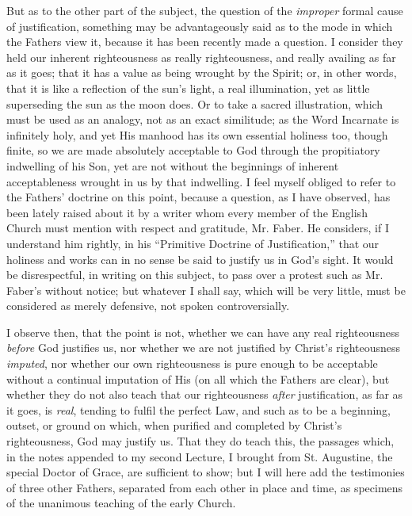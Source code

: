 But as to the other part of the subject, the question of the \emph{improper} formal cause of justification, something may be
advantageously said as to the mode in which the Fathers view it,
because it has been recently made a question. I consider they held our
inherent righteousness as really righteousness, and really availing as
far as it goes; that it has a value as being wrought by the Spirit;
or, in other words, that it is like a reflection of the sun's light, a
real illumination, yet as little superseding the sun as the moon does.
Or to take a sacred illustration, which must be used as an analogy,
not as an exact similitude; as the Word Incarnate is infinitely holy,
and yet His manhood has its own essential holiness too, though finite,
so we are made absolutely acceptable to God through the propitiatory
indwelling of his Son, yet are not without the beginnings of inherent
acceptableness wrought in us by that indwelling. I feel myself obliged
to refer to the Fathers' doctrine on this point, because a question,
as I have observed, has been lately raised about it by a writer whom
every member of the English Church must mention with respect and
gratitude, Mr. Faber. He considers, if I understand him rightly, in
his ``Primitive Doctrine of Justification,'' that our holiness
and works can in no sense be said to justify us in God's sight. It
would be disrespectful, in writing on this subject, to pass over a
protest such as Mr. Faber's without notice; but whatever I shall say,
which will be very little, must be considered as merely defensive, not
spoken controversially.

I observe then, that the point is not, whether we can have any real
righteousness \emph{before} God justifies us, nor whether we are not
justified by Christ's righteousness \emph{imputed}, nor whether our
own righteousness is pure enough to be acceptable without a continual
imputation of His (on all which the Fathers are clear), but whether
they do not also teach that our righteousness \emph{after}
justification, as far as it goes, is \emph{real}, tending to fulfil
the perfect Law, and such as to be a beginning, outset, or ground on
which, when purified and completed by Christ's righteousness, God may
justify us. That they do teach this, the passages which, in the
notes appended to my second Lecture, I brought from St. Augustine, the
special Doctor of Grace, are sufficient to show; but I will here add
the testimonies of three other Fathers, separated from each other in
place and time, as specimens of the unanimous teaching of the early
Church.

